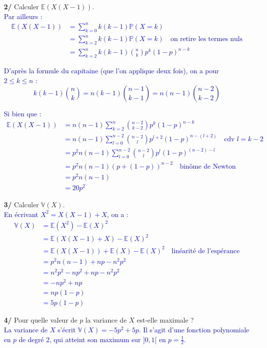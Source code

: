 \documentclass[a4paper,12pt]{article}
\newcommand{\E}{\mathbb{E}}
\newcommand{\prob}{\mathbb{P}}
\begin{document}
\textbf{2/} Calculer $\E (X(X-1))$. \\

\textcolor{blue}{
Par ailleurs :
\begin{align*}
\E(X(X-1)) &= \sum_{k=0}^n k(k-1) \prob(X=k) \\
&= \sum_{k=2}^n k(k-1) \prob(X=k) \quad \text{on retire les termes nuls} \\
&= \sum_{k=2}^n k(k-1) \binom{n}{k} p^k (1-p)^{n-k}
\end{align*}
}

\textcolor{blue}{
D'après la formule du capitaine (que l'on applique deux fois), on a pour $2 \leq k \leq n$ :
\[
k(k-1) \binom{n}{k} = n(k-1) \binom{n-1}{k-1} = n(n-1) \binom{n-2}{k-2}
\]
}

\textcolor{blue}{
Si bien que :
\begin{align*}
\E(X(X-1)) &= n(n-1) \sum_{k=2}^n \binom{n-2}{k-2} p^{k}(1-p)^{n-k} \\
&= n(n-1) \sum_{l=0}^{n-2} \binom{n-2}{l} p^{l+2} (1-p)^{n-(l+2)} \quad \text{cdv } l=k-2 \\
&= p^2 n(n-1) \sum_{l=0}^{n-2} \binom{n-2}{l} p^{l} (1-p)^{(n-2)-l} \\
&= p^2 n(n-1) \left( p + (1-p) \right)^{n-2} \quad \text{binôme de Newton} \\
&= p^2 n(n-1) \\
& = 20p^2
\end{align*}
}

\textbf{3/} Calculer $\mathbb{V} (X)$. \\

\textcolor{blue}{
En écrivant $X^2 = X(X-1) + X$, on a :
\begin{align*}
\mathbb{V}(X) &= \E(X^2) - \E(X)^2 \\
&= \E(X(X-1) + X) - \E(X)^2 \\
&= \E(X(X-1)) + \E(X) - \E(X)^2 \quad \text{linéarité de l'espérance} \\
&= p^2 n(n-1) + np - n^2 p^2 \\
&= n^2 p^2 - np^2 + np - n^2 p^2 \\
&= -np^2 + np \\
&= np(1-p) \\
&\boxed{= 5p(1-p)}
\end{align*}
}

\textbf{4/} Pour quelle valeur de $p$ la variance de $X$ est-elle maximale ? \\

\textcolor{blue}{La variance de $X$ s'écrit $\mathbb{V} (X) = -5p^2 +5p$. Il s'agit d'une fonction polynomiale en $p$ de degré $2$, qui atteint son maximum sur $]0,1[$ en $p=\frac{1}{2}$.} \\
\end{document}
